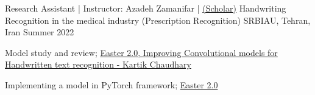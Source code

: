 


\begin{cventries}


\cventry
{Research Assistant | Instructor: Azadeh Zamanifar | \href{https://scholar.google.com/citations?user=YpabXhgAAAAJ&hl=en}{(Scholar)}} %
{Handwriting Recognition in the medical industry (Prescription Recognition)} %
{SRBIAU, Tehran, Iran} %
{Summer 2022} %
{ %
\begin{cvitems}
\item {Model study and review; \href{https://github.com/kartikgill/Easter2}{Easter 2.0, Improving Convolutional models for Handwritten text recognition - Kartik Chaudhary}}
\item {Implementing a model in PyTorch framework; \href{https://github.com/kartikgill/Easter2}{Easter 2.0}}
\end{cvitems}
}


\end{cventries}
